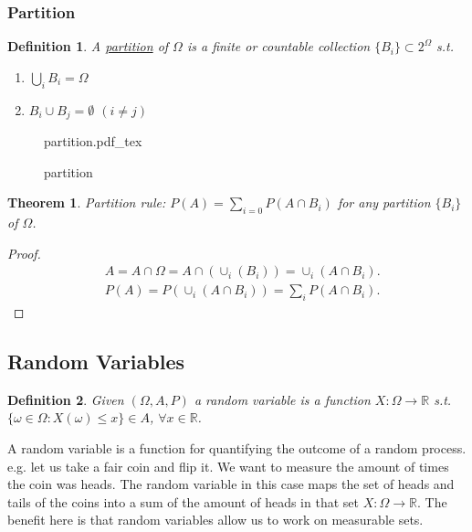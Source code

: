 \documentclass{article}
\newtheorem{theorem}{Theorem}
\newtheorem{definition}{Definition}
\newtheorem{proof}{Proof}
\newcommand{\incfig}[2]{
    \def\svgwidth{#2\columnwidth}
    {#1.pdf_tex}
}
\newcommand{\R}{ \mathbb{R} }
\begin{document}
\subsubsection{Partition}
\begin{definition}
    \label{def:partition}
    A \underline{partition} of $\Omega$ is a finite or countable collection  $\{ B_i \} \subset 2^{\Omega}$ s.t. 
    \begin{enumerate}
        \item $\bigcup_i B_i = \Omega$
        \item $B_i \cup B_j = \emptyset $ $(i \neq j)$
    \end{enumerate}
\end{definition}

\begin{figure}[ht]
    \center
    \incfig{partition}{0.2}
    \caption{partition}
\end{figure}

\begin{theorem}
    \label{thm:partition-rule}
    Partition rule: $P(A) = \sum_{i=0} P(A \cap B_i)$ for any partition $\{ B_i\} $ of $\Omega$.
\end{theorem}

\begin{proof}
    \label{pf:partition-rule}    
\begin{align*}
    &A = A \cap \Omega = A \cap (\cup_i (B_i)) = \cup_i(A \cap B_i). \\
    &P(A) = P(\cup_i (A \cap B_i)) = \sum_{i} P(A \cap B_i)
.\end{align*}
\end{proof}


\subsection{Random Variables}
\begin{definition}
    \label{def:random-variable}
    Given $(\Omega, A, P)$  a random variable is a function $X : \Omega \to \R$ s.t. 
    $\{ \omega \in \Omega : X (\omega) \le  x\} \in A $, $\forall x \in \R$. 
\end{definition}
A random variable is a function for quantifying the outcome of a random process. 
e.g. let us take a fair coin and flip it. We want to measure the amount of times
the coin was heads. The random variable in this case maps the set of heads and 
tails of the coins into a sum of the amount of heads in that set $X : \Omega \to \R$.
The benefit here is that random variables allow us to work on measurable sets.
\end{document}
